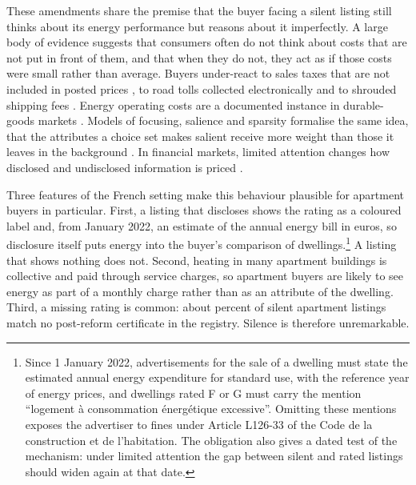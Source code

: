 These amendments share the premise that the buyer facing a silent listing still thinks about its energy performance but reasons about it imperfectly. A large body of evidence suggests that consumers often do not think about costs that are not put in front of them, and that when they do not, they act as if those costs were small rather than average. Buyers under-react to sales taxes that are not included in posted prices \citep{chetty_salience_2009}, to road tolls collected electronically \citep{finkelstein_eztax_2009} and to shrouded shipping fees \citep{brown_shrouded_2010}. Energy operating costs are a documented instance in durable-goods markets \citep[e.g.,][]{allcott_consumers_2011, sallee_rational_2014, allcott_evaluating_2015}. Models of focusing, salience and sparsity formalise the same idea, that the attributes a choice set makes salient receive more weight than those it leaves in the background \citep[e.g.,][]{koszegi_model_2013, bordalo_salience_2013, gabaix_sparsity_2014}. In financial markets, limited attention changes how disclosed and undisclosed information is priced \citep[e.g.,][]{hirshleifer_limited_2003, dellavigna_investor_2009}.

Three features of the French setting make this behaviour plausible for apartment buyers in particular. First, a listing that discloses shows the rating as a coloured label and, from January 2022, an estimate of the annual energy bill in euros, so disclosure itself puts energy into the buyer's comparison of dwellings.\footnote{Since 1 January 2022, advertisements for the sale of a dwelling must state the estimated annual energy expenditure for standard use, with the reference year of energy prices, and dwellings rated F or G must carry the mention ``logement \`a consommation \'energ\'etique excessive''. Omitting these mentions exposes the advertiser to fines under Article L126-33 of the Code de la construction et de l'habitation. %
The obligation also gives a dated test of the mechanism: under limited attention the gap between silent and rated listings should widen again at that date.} A listing that shows nothing does not. Second, heating in many apartment buildings is collective and paid through service charges, so apartment buyers are likely to see energy as part of a monthly charge rather than as an attribute of the dwelling. Third, a missing rating is common: about \attShareUninfApt{} percent of silent apartment listings match no post-reform certificate in the registry. Silence is therefore unremarkable.

